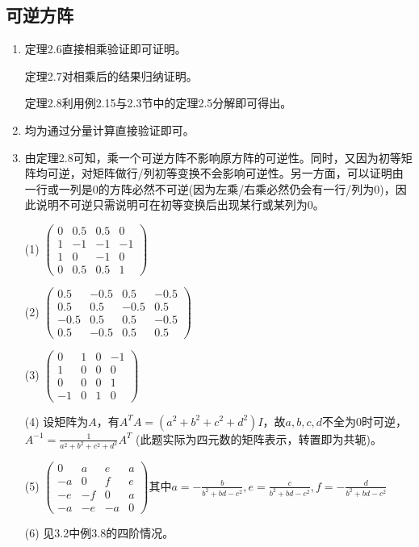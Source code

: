 \documentclass[a4paper,UTF8,fontset=windows]{ctexart}
\begin{document}
\subsection{可逆方阵}
\begin{enumerate}
\item
定理2.6直接相乘验证即可证明。

定理2.7对相乘后的结果归纳证明。

定理2.8利用例2.15与2.3节中的定理2.5分解即可得出。

\item
均为通过分量计算直接验证即可。

\item
由定理2.8可知，乘一个可逆方阵不影响原方阵的可逆性。同时，又因为初等矩阵均可逆，对矩阵做行/列初等变换不会影响可逆性。另一方面，可以证明由一行或一列是0的方阵必然不可逆(因为左乘/右乘必然仍会有一行/列为0)，因此说明不可逆只需说明可在初等变换后出现某行或某列为0。

(1) $\begin{pmatrix}0&0.5&0.5&0\\1&-1&-1&-1\\1&0&-1&0\\0&0.5&0.5&1\end{pmatrix}$

(2) $\begin{pmatrix}0.5&-0.5&0.5&-0.5\\0.5&0.5&-0.5&0.5\\-0.5&0.5&0.5&-0.5\\0.5&-0.5&0.5&0.5\end{pmatrix}$

(3) $\begin{pmatrix}0&1&0&-1\\1&0&0&0\\0&0&0&1\\-1&0&1&0\end{pmatrix}$

(4) 设矩阵为$A$，有$A^TA=(a^2+b^2+c^2+d^2)I$，故$a,b,c,d$不全为0时可逆，$A^{-1}=\frac{1}{a^2+b^2+c^2+d^2}A^T$ (此题实际为四元数的矩阵表示，转置即为共轭)。

(5) $\begin{pmatrix}0&a&e&a\\-a&0&f&e\\-e&-f&0&a\\-a&-e&-a&0\end{pmatrix}$其中$a=-\frac{b}{b^2+bd-c^2},e=\frac{c}{b^2+bd-c^2},f=-\frac{d}{b^2+bd-c^2}$

(6) 见3.2中例3.8的四阶情况。


\end{enumerate}
\end{document}
